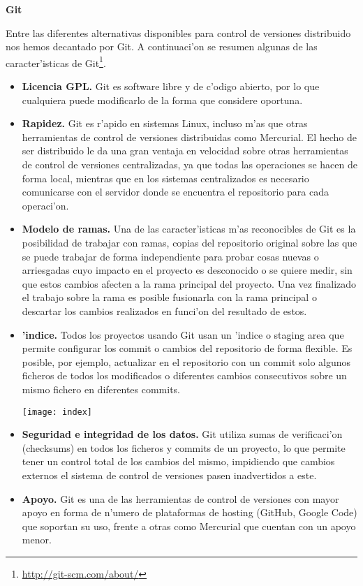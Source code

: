 \textbf{Git}

Entre las diferentes alternativas disponibles para control de versiones distribuido nos hemos decantado por Git.
A continuaci'on se resumen algunas de las caracter'isticas de Git\footnote{\url{http://git-scm.com/about/}}.

\begin{itemize}
\item \textbf{Licencia GPL.} Git es software libre y de c'odigo abierto, por lo que cualquiera puede modificarlo de
la forma que considere oportuna.
\item \textbf{Rapidez.} Git es r'apido en sistemas Linux, incluso m'as que otras herramientas de control de versiones
distribuidas como Mercurial. El hecho de ser distribuido le da una gran ventaja en velocidad sobre otras herramientas
de control de versiones centralizadas, ya que todas las operaciones se hacen de forma local, mientras que en los
sistemas centralizados es necesario comunicarse con el servidor donde se encuentra el repositorio para cada
operaci'on.
\item \textbf{Modelo de ramas.} Una de las caracter'isticas m'as reconocibles de Git es la posibilidad de trabajar
con ramas, copias del repositorio original sobre las que se puede trabajar de forma independiente para probar cosas
nuevas o arriesgadas cuyo impacto en el proyecto es desconocido o se quiere medir, sin que estos cambios afecten a
la rama principal del proyecto. Una vez finalizado el trabajo sobre la rama es posible fusionarla con la rama
principal o descartar los cambios realizados en funci'on del resultado de estos.
\item \textbf{'indice.} Todos los proyectos usando Git usan un 'indice o staging area que permite configurar los
commit o cambios del repositorio de forma flexible. Es posible, por ejemplo, actualizar en el repositorio con un
commit solo algunos ficheros de todos los modificados o diferentes cambios consecutivos sobre un mismo fichero en
diferentes commits.

\begin{center}
\texttt{[image: index]}
\end{center}

\item \textbf{Seguridad e integridad de los datos.} Git utiliza sumas de verificaci'on (checksums) en todos los
ficheros y commits de un proyecto, lo que permite tener un control total de los cambios del mismo, impidiendo que
cambios externos el sistema de control de versiones pasen inadvertidos a este.
\item \textbf{Apoyo.} Git es una de las herramientas de control de versiones con mayor apoyo en forma de n'umero de
plataformas de hosting (GitHub, Google Code) que soportan su uso, frente a otras como Mercurial que cuentan con un
apoyo menor.
\end{itemize}

